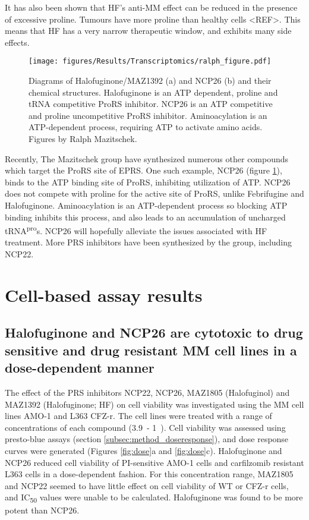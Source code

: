 It has also been shown that HF's anti-MM effect can be reduced in the presence of excessive proline.
Tumours have more proline than healthy cells <REF>.
This means that HF has a very narrow therapeutic window, and exhibits many side effects.

\begin{figure}[ht]
    \centering
    \texttt{[image: figures/Results/Transcriptomics/ralph\_figure.pdf]}
    \caption[Halofuginone and NCP26 structures]{Diagrams of Halofuginone/MAZ1392 (a) and NCP26 (b) and their chemical structures.
    Halofuginone is an ATP dependent, proline and tRNA competitive ProRS inhibitor.
    NCP26 is an ATP competitive and proline uncompetitive ProRS inhibitor.
    Aminoacylation is an ATP-dependent process, requiring ATP to activate amino acids.
    Figures by Ralph Mazitschek.
    }
    \label{fig:ralph_diagrams}
\end{figure}

Recently, The Mazitschek group have synthesized numerous other compounds which target the ProRS site of EPRS.
One such example, NCP26 (figure \ref{fig:ralph_diagrams}), binds to the ATP binding site of ProRS, inhibiting utilization of ATP.
NCP26 does not compete with proline for the active site of ProRS, unlike Febrifugine and Halofuginone.
Aminoacylation is an ATP-dependent process so blocking ATP binding inhibits this process, and also leads to an accumulation of uncharged tRNA\textsuperscript{pro}s.
NCP26 will hopefully alleviate the issues associated with HF treatment.
More PRS inhibitors have been synthesized by the group, including NCP22.

\clearpage

\section{Cell-based assay results}


\subsection{Halofuginone and NCP26 are cytotoxic to drug sensitive and drug resistant MM cell lines in a dose-dependent manner}
The effect of the PRS inhibitors NCP22, NCP26, MAZ1805 (Halofuginol) and MAZ1392 (Halofuginone; HF) on cell viability was investigated using the MM cell lines AMO-1 and L363 CFZ-r.
The cell lines were treated with a range of concentrations of each compound (3.9\si{\nano\Molar}- 1\si{\micro\Molar}).
Cell viability was assessed using presto-blue assays (section \ref{subsec:method_doseresponse}), and dose response curves were generated (Figures \ref{fig:dose}a and \ref{fig:dose}c).
Halofuginone and NCP26 reduced cell viability of PI-sensitive AMO-1 cells and carfilzomib resistant L363 cells in a dose-dependent fashion.
For this concentration range, MAZ1805 and NCP22 seemed to have little effect on cell viability of WT or CFZ-r cells, and IC\textsubscript{50} values were unable to be calculated.
Halofuginone was found to be more potent than NCP26.


